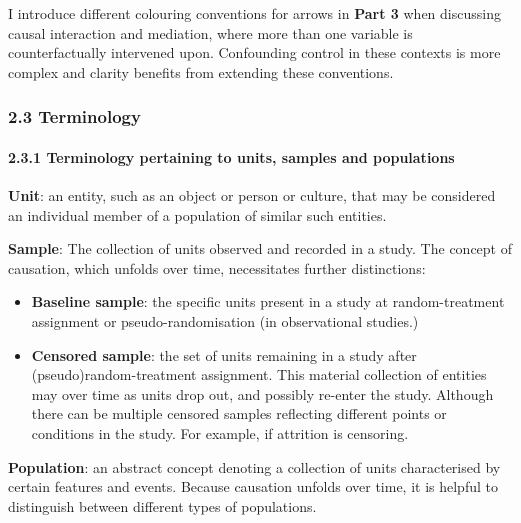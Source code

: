 \documentclass[
  singlecolumn]{article}
\let\oldparagraph\paragraph
\renewcommand{\paragraph}[1]{\oldparagraph{#1}\mbox{}}
\begin{document}
I introduce different colouring conventions for arrows in \textbf{Part
3} when discussing causal interaction and mediation, where more than one
variable is counterfactually intervened upon. Confounding control in
these contexts is more complex and clarity benefits from extending these
conventions.

\subsubsection{2.3 Terminology}\label{terminology}

\paragraph{2.3.1 Terminology pertaining to units, samples and
populations}\label{terminology-pertaining-to-units-samples-and-populations}

\textbf{Unit}: an entity, such as an object or person or culture, that
may be considered an individual member of a population of similar such
entities.

\textbf{Sample}: The collection of units observed and recorded in a
study. The concept of causation, which unfolds over time, necessitates
further distinctions:

\begin{itemize}
\item
  \textbf{Baseline sample}: the specific units present in a study at
  random-treatment assignment or pseudo-randomisation (in observational
  studies.)
\item
  \textbf{Censored sample}: the set of units remaining in a study after
  (pseudo)random-treatment assignment. This material collection of
  entities may over time as units drop out, and possibly re-enter the
  study. Although there can be multiple censored samples reflecting
  different points or conditions in the study. For example, if attrition
  is censoring.
\end{itemize}

\textbf{Population}: an abstract concept denoting a collection of units
characterised by certain features and events. Because causation unfolds
over time, it is helpful to distinguish between different types of
populations.
\end{document}
